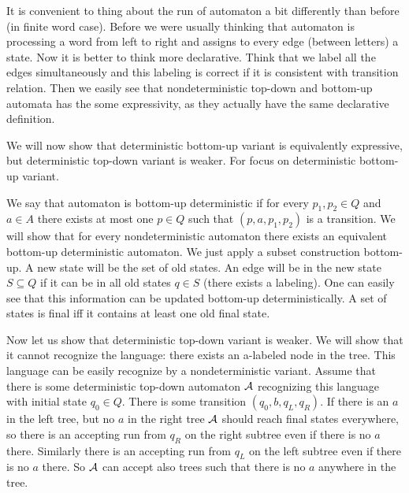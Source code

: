 {
It is convenient to thing about the run of automaton a bit differently than before (in finite word case). Before we were usually
thinking that automaton is processing a word from left to right and assigns to every edge (between letters) a state.
Now it is better to think more declarative. Think that we label all the edges simultaneously and this labeling is correct
if it is consistent with transition relation. Then we easily see that nondeterministic top-down and bottom-up automata
has the some expressivity, as they actually have the same declarative definition.

We will now show that deterministic bottom-up variant is equivalently expressive, but deterministic top-down
variant is weaker. For focus on deterministic bottom-up variant.

We say that automaton is bottom-up deterministic if for every $p_1, p_2 \in Q$ and $a \in A$ there exists at most
one $p \in Q$ such that $(p, a, p_1, p_2)$ is a transition. We will show that for every nondeterministic automaton there
exists an equivalent bottom-up deterministic automaton. We just apply a subset construction bottom-up. A new state
will be the set of old states. An edge will be in the new state $S \subseteq Q$ if it can be in all old states $q \in S$
(there exists a labeling). One can easily see that this information can be updated bottom-up deterministically. A set of states
is final iff it contains at least one old final state.

Now let us show that deterministic top-down variant is weaker. We will show that it cannot recognize the language:
there exists an a-labeled node in the tree. This language can be easily recognize by a nondeterministic variant.
Assume that there is some deterministic top-down automaton $\mathcal{A}$ recognizing this language with initial state $q_0 \in Q$.
There is some transition $(q_0, b, q_L, q_R)$. If there is an $a$ in the left tree, but no $a$ in the right tree $\mathcal{A}$ should
reach final states everywhere, so there is an accepting run from $q_R$ on the right subtree even if there is no $a$ there.
Similarly there is an accepting run from $q_L$ on the left subtree even if there is no $a$ there. So $\mathcal{A}$ can accept also
trees such that there is no $a$ anywhere in the tree.
}





